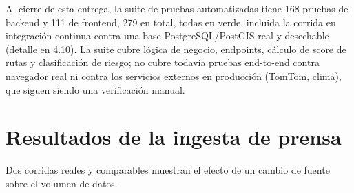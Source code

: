 Al cierre de esta entrega, la suite de pruebas automatizadas tiene 168
pruebas de backend y 111 de frontend, 279 en total, todas en verde,
incluida la corrida en integración continua contra una base
PostgreSQL/PostGIS real y desechable (detalle en 4.10). La suite cubre
lógica de negocio, endpoints, cálculo de score de rutas y clasificación
de riesgo; no cubre todavía pruebas end-to-end contra navegador real ni
contra los servicios externos en producción (TomTom, clima), que siguen
siendo una verificación manual.

\section{Resultados de la ingesta de prensa}

Dos corridas reales y comparables muestran el efecto de un cambio de
fuente sobre el volumen de datos.


